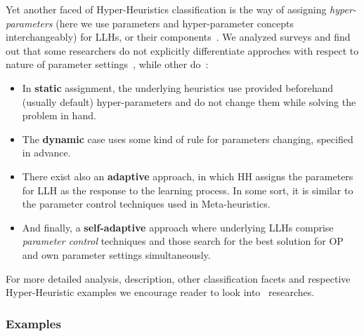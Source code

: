 Yet another faced of Hyper-Heuristics classification is the way of assigning \textit{hyper-parameters} (here we use parameters and hyper-parameter concepts interchangeably) for LLHs, or their components~\cite{drake2019recent}. We analyzed surveys and find out that some researchers do not explicitly differentiate approches with respect to nature of parameter settings~\cite{ryser2014review,burke2013hyper,burke2019classification}, while other do~\cite{drake2019recent}:
\begin{itemize}
	\item In \textbf{static} assignment, the underlying heuristics use provided beforehand (usually default) hyper-parameters and do not change them while solving the problem in hand.

	\item The \textbf{dynamic} case uses some kind of rule for parameters changing, specified in advance.

	\item There exist also an \textbf{adaptive} approach, in which HH assigns the parameters for LLH as the response to the learning process. In some sort, it is similar to the parameter control techniques used in Meta-heuristics.
	
	\item And finally, a \textbf{self-adaptive} approach where underlying LLHs comprise \textit{parameter control} techniques and those search for the best solution for OP and own parameter settings simultaneously.
\end{itemize}


For more detailed analysis, description, other classification facets and respective Hyper-Heuristic examples we encourage reader to look into~\cite{burke2003hyper,ryser2014review,drake2019recent,burke2019classification,kerschke2019automated} researches.

\subsubsection{Examples}\label{bg: hh examples}%

